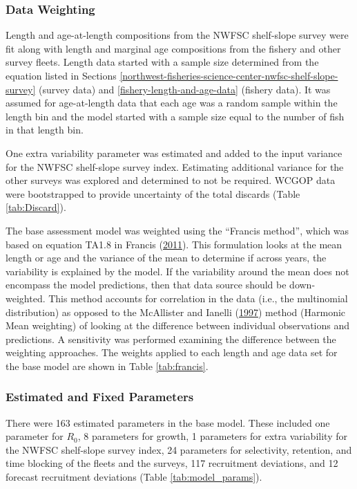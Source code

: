 \documentclass[12pt,]{article}
\begin{document}
\subsubsection{Data Weighting}\label{data-weighting}

Length and age-at-length compositions from the NWFSC shelf-slope survey
were fit along with length and marginal age compositions from the
fishery and other survey fleets. Length data started with a sample size
determined from the equation listed in Sections
\ref{northwest-fisheries-science-center-nwfsc-shelf-slope-survey}
(survey data) and \ref{fishery-length-and-age-data} (fishery data). It
was assumed for age-at-length data that each age was a random sample
within the length bin and the model started with a sample size equal to
the number of fish in that length bin.

One extra variability parameter was estimated and added to the input
variance for the NWFSC shelf-slope survey index. Estimating additional
variance for the other surveys was explored and determined to not be
required. WCGOP data were bootstrapped to provide uncertainty of the
total discards (Table \ref{tab:Discard}).

The base assessment model was weighted using the ``Francis method'',
which was based on equation TA1.8 in Francis
(\protect\hyperlink{ref-francis_data_2011}{2011}). This formulation
looks at the mean length or age and the variance of the mean to
determine if across years, the variability is explained by the model. If
the variability around the mean does not encompass the model
predictions, then that data source should be down-weighted. This method
accounts for correlation in the data (i.e., the multinomial
distribution) as opposed to the McAllister and Ianelli
(\protect\hyperlink{ref-mcallister_bayesian_1997}{1997}) method
(Harmonic Mean weighting) of looking at the difference between
individual observations and predictions. A sensitivity was performed
examining the difference between the weighting approaches. The weights
applied to each length and age data set for the base model are shown in
Table \ref{tab:francis}.

\subsubsection{Estimated and Fixed
Parameters}\label{estimated-and-fixed-parameters}

There were 163 estimated parameters in the base model. These included
one parameter for \(R_0\), 8 parameters for growth, 1 parameters for
extra variability for the NWFSC shelf-slope survey index, 24 parameters
for selectivity, retention, and time blocking of the fleets and the
surveys, 117 recruitment deviations, and 12 forecast recruitment
deviations (Table \ref{tab:model_params}).
\end{document}
